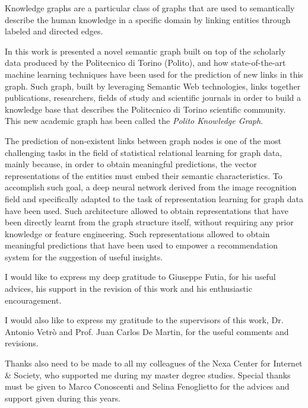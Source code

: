 \documentclass[%
    corpo=13.5pt,
    twoside,
    oldstyle,
    tipotesi=magistrale,
    greek,
    evenboxes
]{toptesi}
\begin{document}
Knowledge graphs are a particular class of graphs that are used to
semantically describe the human knowledge in a specific domain by linking
entities through labeled and directed edges.

In this work is presented a novel semantic graph built on top of the
scholarly data produced by the Politecnico di Torino (Polito), and how
state-of-the-art machine learning techniques have been used for the
prediction of new links in this graph.
Such graph, built by leveraging Semantic Web technologies, links together
publications, researchers, fields of study and scientific journals in order
to build a knowledge base that describes the Politecnico di Torino scientific
community.
This new academic graph has been called the \emph{Polito Knowledge Graph}.

The prediction of non-existent links between graph nodes is one of the
most challenging tasks in the field of statistical relational learning for graph
data, mainly because, in order to obtain meaningful predictions, the vector
representations of the entities must embed their semantic characteristics.
To accomplish such goal, a deep neural network derived
from the image recognition field and specifically adapted to the task of
representation learning for graph data have been used.
Such architecture allowed to obtain representations that have been
directly learnt from the graph structure itself, without requiring any prior
knowledge or feature engineering.
Such representations allowed to obtain meaningful predictions
that have been used to empower a recommendation system for the suggestion of useful
insights.

\ringraziamenti

I would like to express my deep gratitude to Giuseppe Futia, for his useful
advices, his support in the revision of this work and his enthusiastic
encouragement.

I would also like to express my gratitude to the supervisors of this work,
Dr. Antonio Vetrò and Prof. Juan Carlos De Martin, for the useful comments
and revisions.

Thanks also need to be made to all my colleagues of the
Nexa Center for Internet \& Society, who supported me during my master
degree studies.
Special thanks must be given to Marco Conoscenti and Selina Fenoglietto for
the advices and support given during this years.
\end{document}
